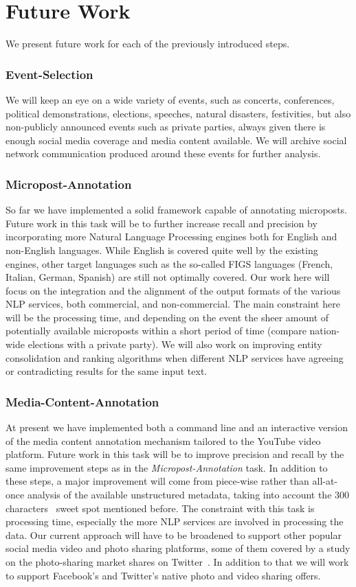 \documentclass[runningheads,a4paper]{llncs}
\begin{document}
\section{Future Work}
We present future work for each of the previously introduced steps.

\subsubsection{Event-Selection}
We will keep an eye on a wide variety of events, such as concerts, conferences, political demonstrations, elections, speeches, natural disasters, festivities, but also non-publicly announced events such as private parties, always given there is enough social media coverage and media content available. We will archive social network communication produced around these events for further analysis.

\subsubsection{Micropost-Annotation}
So far we have implemented a solid framework capable of annotating microposts. Future work in this task will be to further increase recall and precision by incorporating more Natural Language Processing engines both for English and non-English languages. While English is covered quite well by the existing engines, other target languages such as the so-called FIGS languages (French, Italian, German, Spanish) are still not optimally covered. Our work here will focus on the integration and the alignment of the output formats of the various NLP services, both commercial, and non-commercial. The main constraint here will be the processing time, and depending on the event the sheer amount of potentially available microposts within a short period of time (compare nation-wide elections with a private party). We will also work on improving entity consolidation and ranking algorithms when different NLP services have agreeing or contradicting results for the same input text.

\subsubsection{Media-Content-Annotation}
At present we have implemented both a command line and an interactive version of the media content annotation mechanism tailored to the YouTube video platform. Future work in this task will be to improve precision and recall by the same improvement steps as in the \emph{Micropost-Annotation} task. In addition to these steps, a major improvement will come from piece-wise rather than all-at-once analysis of the available unstructured metadata, taking into account the 300 characters~\cite{andraz} sweet spot mentioned before. The constraint with this task is processing time, especially the more NLP services are involved in processing the data. Our current approach will have to be broadened to support other popular social media video and photo sharing platforms, some of them covered by a study on the photo-sharing market shares on Twitter~\cite{techcrunch}. In addition to that we will work to support Facebook's and Twitter's native photo and video sharing offers.
\end{document}
